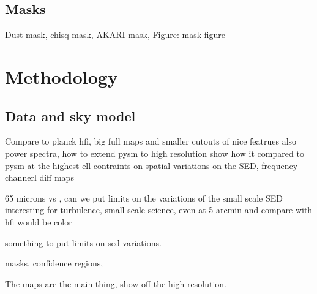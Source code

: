 \documentclass{aa}
\begin{document}
\subsection{Masks}
\label{sec:masks}
Dust mask, chisq mask, AKARI mask, 
Figure: mask figure

\section{Methodology}
\label{sec:method}


\subsection{Data and sky model}
\label{sec:dat_model}
Compare to planck hfi, big full maps and smaller cutouts of nice featrues
also power spectra, how to extend pysm to high resolution
show how it compared to pysm at the highest ell
contraints on spatial variations on the SED, frequency channerl diff maps


65 microns vs , can we put limits on the variations of the small scale SED
interesting for turbulence, small scale science, even at 5 arcmin and compare with hfi would be color

something to put limits on sed variations. 

masks, confidence regions, 

The maps are the main thing, show off the high resolution. 
\end{document}

